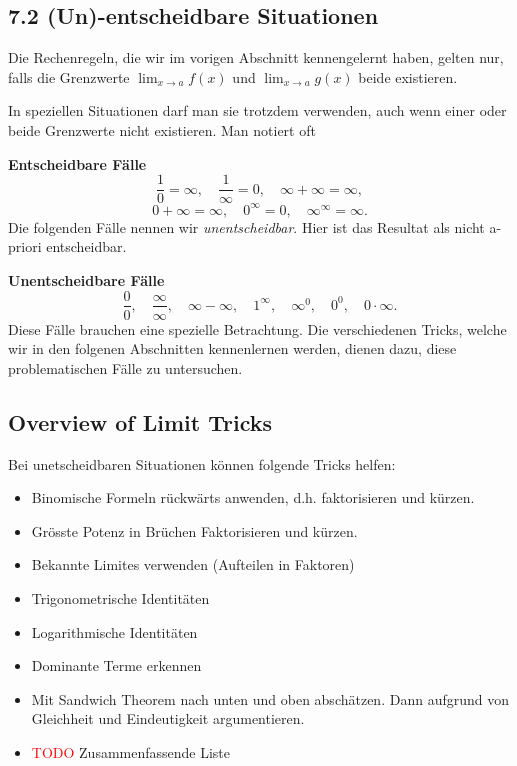 \documentclass[a4paper,landscape,8pt]{extarticle}
\newcommand{\todo}{\textcolor{red}{TODO }}
\begin{document}
\begin{multicols*}{4}
\subsection{7.2 (Un)-entscheidbare Situationen}

Die Rechenregeln, die wir im vorigen Abschnitt kennengelernt haben, gelten nur,
falls die Grenzwerte $\lim_{x\to a} f(x)$ und $\lim_{x\to a} g(x)$ beide
existieren.

In speziellen Situationen darf man sie trotzdem verwenden, auch wenn einer oder
beide Grenzwerte nicht existieren. Man notiert oft

\textbf{Entscheidbare Fälle}
\[
\frac{1}{0} = \infty,
\quad
\frac{1}{\infty} = 0,
\quad
\infty + \infty = \infty,
\]
\[
0 + \infty = \infty,
\quad
0^\infty = 0,
\quad
\infty^\infty = \infty.
\]
Die folgenden Fälle nennen wir \emph{unentscheidbar}. Hier ist das Resultat als
nicht a-priori entscheidbar.

\textbf{Unentscheidbare Fälle}
\[
\frac{0}{0}, \quad \frac{\infty}{\infty}, \quad \infty-\infty, \quad
1^{\infty}, \quad \infty^{0}, \quad 0^0, \quad 0\cdot\infty.
\]
Diese Fälle brauchen eine spezielle Betrachtung. Die verschiedenen Tricks,
welche wir in den folgenen Abschnitten kennenlernen werden, dienen dazu, diese
problematischen Fälle zu untersuchen.

\begin{warmup}
\subsection{Overview of Limit Tricks}

Bei unetscheidbaren Situationen können folgende Tricks helfen:

\begin{itemize}
  \item Binomische Formeln rückwärts anwenden, d.h. faktorisieren und kürzen.
  \item Grösste Potenz in Brüchen Faktorisieren und kürzen.
  \item Bekannte Limites verwenden (Aufteilen in Faktoren)
  \item Trigonometrische Identitäten
  \item Logarithmische Identitäten
  \item Dominante Terme erkennen
  \item Mit Sandwich Theorem nach unten und oben abschätzen. Dann aufgrund von
  Gleichheit und Eindeutigkeit argumentieren.
  \item \todo Zusammenfassende Liste
\end{itemize}
\end{warmup}


\end{multicols*}
\end{document}
